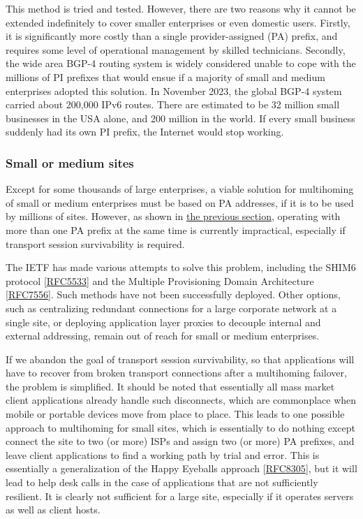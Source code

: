 \documentclass[
]{article}
\begin{document}
This method is tried and tested. However, there are two reasons why it
cannot be extended indefinitely to cover smaller enterprises or even
domestic users. Firstly, it is significantly more costly than a single
provider-assigned (PA) prefix, and requires some level of operational
management by skilled technicians. Secondly, the wide area BGP-4 routing
system is widely considered unable to cope with the millions of PI
prefixes that would ensue if a majority of small and medium enterprises
adopted this solution. In November 2023, the global BGP-4 system carried
about 200,000 IPv6 routes. There are estimated to be 32 million small
businesses in the USA alone, and 200 million in the world. If every
small business suddenly had its own PI prefix, the Internet would stop
working.

\subsubsection{Small or medium sites}\label{small-or-medium-sites}

Except for some thousands of large enterprises, a viable solution for
multihoming of small or medium enterprises must be based on PA
addresses, if it is to be used by millions of sites. However, as shown
in \hyperref[multi-prefix-operation]{the previous section}, operating
with more than one PA prefix at the same time is currently impractical,
especially if transport session survivability is required.

The IETF has made various attempts to solve this problem, including the
SHIM6 protocol
{[}\href{https://www.rfc-editor.org/info/rfc5533}{RFC5533}{]} and the
Multiple Provisioning Domain Architecture
{[}\href{https://www.rfc-editor.org/info/rfc7556}{RFC7556}{]}. Such
methods have not been successfully deployed. Other options, such as
centralizing redundant connections for a large corporate network at a
single site, or deploying application layer proxies to decouple internal
and external addressing, remain out of reach for small or medium
enterprises.

If we abandon the goal of transport session survivability, so that
applications will have to recover from broken transport connections
after a multihoming failover, the problem is simplified. It should be
noted that essentially all mass market client applications already
handle such disconnects, which are commonplace when mobile or portable
devices move from place to place. This leads to one possible approach to
multihoming for small sites, which is essentially to do nothing except
connect the site to two (or more) ISPs and assign two (or more) PA
prefixes, and leave client applications to find a working path by trial
and error. This is essentially a generalization of the Happy Eyeballs
approach {[}\href{https://www.rfc-editor.org/info/rfc8305}{RFC8305}{]},
but it will lead to help desk calls in the case of applications that are
not sufficiently resilient. It is clearly not sufficient for a large
site, especially if it operates servers as well as client hosts.
\end{document}
